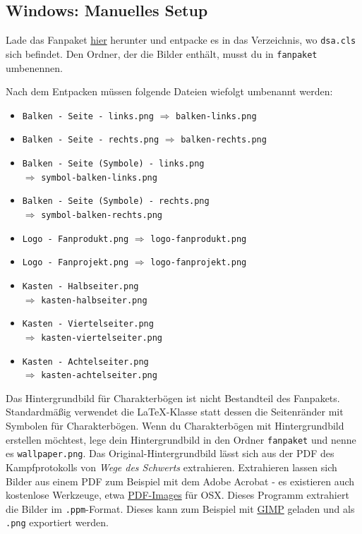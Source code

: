 \documentclass{dsa}
\begin{document}
   \begin{dsaBoxPortrait}
      \subsection*{Windows: Manuelles Setup}
      Lade das Fanpaket
      \href{http://www.ulisses-spiele.de/download/889/}{hier} herunter und
      entpacke es in das Verzeichnis, wo \texttt{dsa.cls} sich befindet. Den
      Ordner, der die Bilder enthält, musst du in \texttt{fanpaket} umbenennen.
      
      Nach dem Entpacken müssen folgende Dateien wiefolgt umbenannt werden:
      
      \scriptsize
      \begin{itemize} \itemsep0em
         \item \texttt{Balken - Seite - links.png} $\Rightarrow$ \texttt{balken-links.png}
         \item \texttt{Balken - Seite - rechts.png} $\Rightarrow$ \texttt{balken-rechts.png}
         \item \texttt{Balken - Seite (Symbole) - links.png} \\ $\Rightarrow$ \texttt{symbol-balken-links.png}
         \item \texttt{Balken - Seite (Symbole) - rechts.png} \\ $\Rightarrow$ \texttt{symbol-balken-rechts.png}
         \item \texttt{Logo - Fanprodukt.png} $\Rightarrow$ \texttt{logo-fanprodukt.png}
         \item \texttt{Logo - Fanprojekt.png} $\Rightarrow$ \texttt{logo-fanprojekt.png}
         \item \texttt{Kasten - Halbseiter.png} \\ $\Rightarrow$ \texttt{kasten-halbseiter.png}
         \item \texttt{Kasten - Viertelseiter.png} \\ $\Rightarrow$ \texttt{kasten-viertelseiter.png}
         \item \texttt{Kasten - Achtelseiter.png} \\ $\Rightarrow$ \texttt{kasten-achtelseiter.png}
      \end{itemize}
   \end{dsaBoxPortrait}
   
   Das Hintergrundbild für Charakterbögen ist nicht Bestandteil des Fanpakets.
   Standardmäßig verwendet die \LaTeX-Klasse statt dessen die Seitenränder mit
   Symbolen für Charakterbögen. Wenn du Charakterbögen mit Hintergrundbild
   erstellen möchtest, lege dein Hintergrundbild in den Ordner \texttt{fanpaket}
   und nenne es \texttt{wallpaper.png}. Das Original-Hintergrundbild lässt sich
   aus der PDF des Kampfprotokolls von \textit{Wege des Schwerts} extrahieren.
   Extrahieren lassen sich Bilder aus einem PDF zum Beispiel mit dem Adobe
   Acrobat - es existieren auch kostenlose Werkzeuge, etwa
   \href{http://sourceforge.net/projects/pdf-images/}{PDF-Images} für OSX.
   Dieses Programm extrahiert die Bilder im \texttt{.ppm}-Format. Dieses kann
   zum Beispiel mit \href{http://www.gimp.org}{GIMP} geladen und als
   \texttt{.png} exportiert werden.
   
\end{document}
